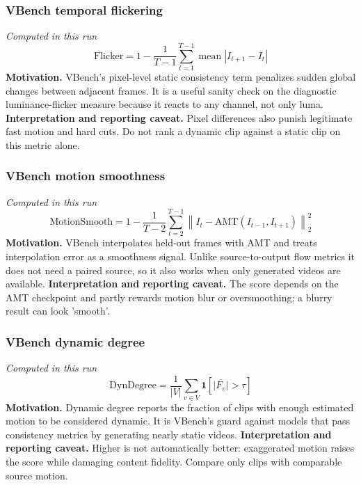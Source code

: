 \documentclass[10pt]{article}
\begin{document}
\subsubsection*{VBench temporal flickering}
\textit{Computed in this run}
\begin{equation*}
\mathrm{Flicker}=1-\frac{1}{T-1}\sum_{t=1}^{T-1}\operatorname{mean}\left|I_{t+1}-I_t\right|
\end{equation*}
\textbf{Motivation.} VBench's pixel-level static consistency term penalizes sudden global changes between adjacent frames. It is a useful sanity check on the diagnostic luminance-flicker measure because it reacts to any channel, not only luma.
\textbf{Interpretation and reporting caveat.} Pixel differences also punish legitimate fast motion and hard cuts. Do not rank a dynamic clip against a static clip on this metric alone.
\subsubsection*{VBench motion smoothness}
\textit{Computed in this run}
\begin{equation*}
\mathrm{MotionSmooth}=1-\frac{1}{T-2}\sum_{t=2}^{T-1}\left\|I_t-\mathrm{AMT}(I_{t-1},I_{t+1})\right\|_2^2
\end{equation*}
\textbf{Motivation.} VBench interpolates held-out frames with AMT and treats interpolation error as a smoothness signal. Unlike source-to-output flow metrics it does not need a paired source, so it also works when only generated videos are available.
\textbf{Interpretation and reporting caveat.} The score depends on the AMT checkpoint and partly rewards motion blur or oversmoothing; a blurry result can look 'smooth'.
\subsubsection*{VBench dynamic degree}
\textit{Computed in this run}
\begin{equation*}
\mathrm{DynDegree}=\frac{1}{|V|}\sum_{v\in V}\mathbf{1}\!\left[\overline{\left|F_v\right|}>\tau\right]
\end{equation*}
\textbf{Motivation.} Dynamic degree reports the fraction of clips with enough estimated motion to be considered dynamic. It is VBench's guard against models that pass consistency metrics by generating nearly static videos.
\textbf{Interpretation and reporting caveat.} Higher is not automatically better: exaggerated motion raises the score while damaging content fidelity. Compare only clips with comparable source motion.
\end{document}
